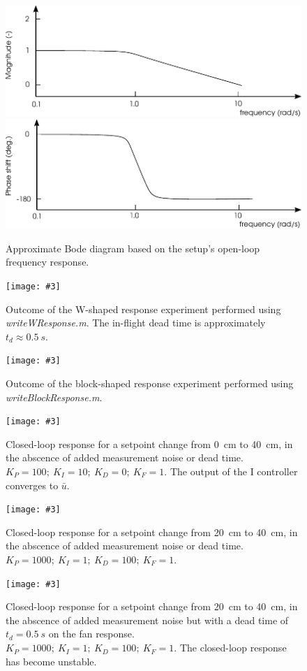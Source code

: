 \documentclass[10pt,twoside,openright]{article}
\newcommand{\mijnfiguur}[5][ht]{            %
    \begin{figure}[#1]                      %
        \begin{center}                      %
            \texttt{[image: \#3]}        %
        \end{center}
        \caption{#4\label{#5}}          %
    \end{figure}
    }
\begin{document}
\begin{figure}[t!]
	\centering
	\includegraphics[width=0.75\linewidth]{bode_diagram_open_1.pdf}
	\includegraphics[width=0.75\linewidth]{bode_diagram_open_2.pdf}
	\caption{Approximate Bode diagram based on the setup's open-loop frequency response.}
	\label{fig:approx_bode_diagram_open}
\end{figure}

\mijnfiguur[h!]{width=\linewidth}{wResponse.pdf}{Outcome of the W-shaped response experiment performed using \textit{writeWResponse.m}. The in-flight dead time is approximately $t_d \approx 0.5~s$.}{fig:wResponse}

\mijnfiguur[h!]{width=\linewidth}{blockResponse.pdf}{Outcome of the block-shaped response experiment performed using \textit{writeBlockResponse.m}.}{fig:blockResponse}
 
\mijnfiguur[h!]{width=\linewidth}{tuned_PID1.pdf}{Closed-loop response for a setpoint change from 0~cm to 40~cm, in the abscence of added measurement noise or dead time. $K_P=100;~ K_I=10;~ K_D=0;~K_F=1$. The output of the I controller converges to $\bar{u}$.}{fig:tuned_PID1}
 
\mijnfiguur[h!]{width=\linewidth}{tuned_PID2.pdf}{Closed-loop response for a setpoint change from 20~cm to 40~cm, in the abscence of added measurement noise or dead time. $K_P=1000;~K_I=1;~K_D=100;~K_F=1$.}{fig:tuned_PID2}

\mijnfiguur[h!]{width=\linewidth}{tuned_PID3.pdf}{Closed-loop response for a setpoint change from 20~cm to 40~cm, in the abscence of added measurement noise but with a dead time of $t_d=0.5~s$ on the fan response. $K_P=1000;~ K_I=1;~ K_D=100;~K_F=1$. The closed-loop response has become unstable.}{fig:tuned_PID3}
\end{document}
